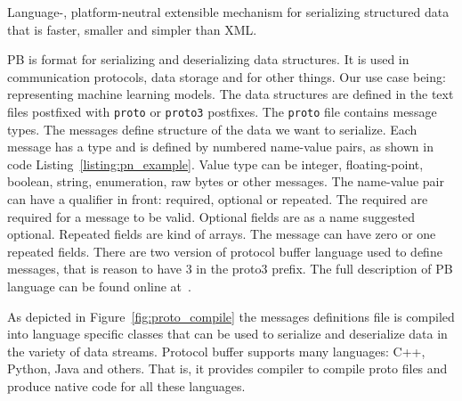 \documentclass[english, 12pt, a4paper, elec, utf8, online]{aaltothesis}
\begin{document}
\begin{center}
Language-, platform-neutral extensible mechanism for serializing structured data that is faster, smaller and simpler than XML.
\end{center}

PB is format for serializing and deserializing data structures. It is used in communication protocols, data storage and for other things. Our use case being: representing machine learning models. The data structures are defined in the text files postfixed with \texttt{proto} or \texttt{proto3} postfixes. The \texttt{proto} file contains message types. The messages define structure of the data we want to serialize. Each message has a type and is defined by numbered name-value pairs, as shown in code Listing~\ref{listing:pn_example}. Value type can be integer, floating-point, boolean, string, enumeration, raw bytes or other messages. The name-value pair can have a qualifier in front: required, optional or repeated. The required are required for a message to be valid. Optional fields are as a name suggested optional. Repeated fields are kind of arrays. The message can have zero or one repeated fields. There are two version of protocol buffer language used to define messages, that is reason to have 3 in the proto3 prefix. The full description of PB language can be found online at~\cite{pb_reference}. 



As depicted in Figure~\ref{fig:proto_compile} the messages definitions file is compiled into language specific classes that can be used to serialize and deserialize data in the variety of data streams. Protocol buffer supports many languages: C++, Python, Java and others. That is, it provides compiler to compile proto files and produce native code for all these languages.
\end{document}
